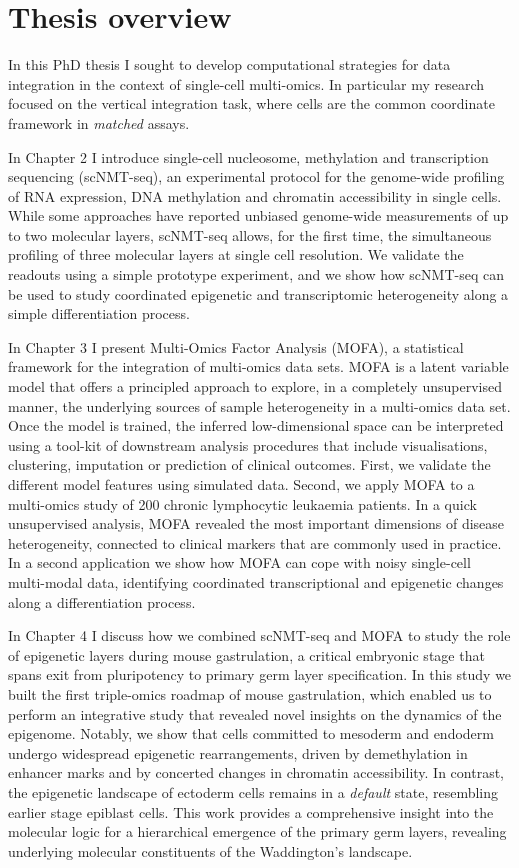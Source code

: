 \section{Thesis overview}

In this PhD thesis I sought to develop computational strategies for data integration in the context of single-cell multi-omics. In particular my research focused on the vertical integration task, where cells are the common coordinate framework in \textit{matched} assays.

In Chapter 2 I introduce single-cell nucleosome, methylation and transcription sequencing (scNMT-seq), an experimental protocol for the genome-wide profiling of RNA expression, DNA methylation and chromatin accessibility in single cells. While some approaches have reported unbiased genome-wide measurements of up to two molecular layers, scNMT-seq allows, for the first time, the simultaneous profiling of three molecular layers at single cell resolution. We validate the readouts using a simple prototype experiment, and we show how scNMT-seq can be used to study coordinated epigenetic and transcriptomic heterogeneity along a simple differentiation process.

In Chapter 3 I present Multi-Omics Factor Analysis (MOFA), a statistical framework for the integration of multi-omics data sets. MOFA is a latent variable model that offers a principled approach to explore, in a completely unsupervised manner, the underlying sources of sample heterogeneity in a multi-omics data set. Once the model is trained, the inferred low-dimensional space can be interpreted using a tool-kit of downstream analysis procedures that include visualisations, clustering, imputation or prediction of clinical outcomes. First, we validate the different model features using simulated data. Second, we apply MOFA to a multi-omics study of 200 chronic lymphocytic leukaemia patients. In a quick unsupervised analysis, MOFA revealed the most important dimensions of disease heterogeneity, connected to clinical markers that are commonly used in practice. In a second application we show how MOFA can cope with noisy single-cell multi-modal data, identifying coordinated transcriptional and epigenetic changes along a differentiation process.

In Chapter 4 I discuss how we combined scNMT-seq and MOFA to study the role of epigenetic layers during mouse gastrulation, a critical embryonic stage that spans exit from pluripotency to primary germ layer specification. In this study we built the first triple-omics roadmap of mouse gastrulation, which enabled us to perform an integrative study that revealed novel insights on the dynamics of the epigenome. Notably, we show that cells committed to mesoderm and endoderm undergo widespread epigenetic rearrangements, driven by demethylation in enhancer marks and by concerted changes in chromatin accessibility. In contrast, the epigenetic landscape of ectoderm cells remains in a \textit{default} state, resembling earlier stage epiblast cells. This work provides a comprehensive insight into the molecular logic for a hierarchical emergence of the primary germ layers, revealing underlying molecular constituents of the Waddington's landscape.

